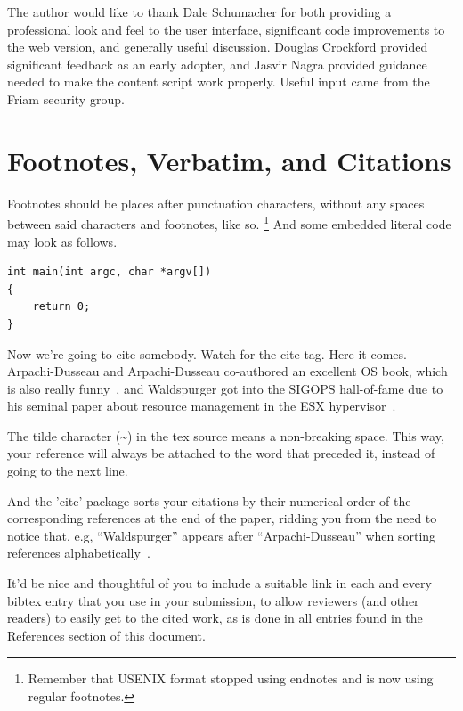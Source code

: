 The author would like to thank Dale Schumacher for both providing a professional look and feel to the user interface, significant code improvements to the web version, and generally useful discussion.  Douglas Crockford provided significant feedback as an early adopter, and Jasvir Nagra provided guidance needed to make the content script work properly.  Useful input came from the Friam security group.

\section{Footnotes, Verbatim, and Citations}

Footnotes should be places after punctuation characters, without any
spaces between said characters and footnotes, like so.%
\footnote{Remember that USENIX format stopped using endnotes and is
  now using regular footnotes.} And some embedded literal code may
look as follows.

\begin{verbatim}
int main(int argc, char *argv[]) 
{
    return 0;
}
\end{verbatim}

Now we're going to cite somebody. Watch for the cite tag. Here it
comes. Arpachi-Dusseau and Arpachi-Dusseau co-authored an excellent OS
book, which is also really funny~\cite{arpachiDusseau18:osbook}, and
Waldspurger got into the SIGOPS hall-of-fame due to his seminal paper
about resource management in the ESX hypervisor~\cite{waldspurger02}.

The tilde character (\~{}) in the tex source means a non-breaking
space. This way, your reference will always be attached to the word
that preceded it, instead of going to the next line.

And the 'cite' package sorts your citations by their numerical order
of the corresponding references at the end of the paper, ridding you
from the need to notice that, e.g, ``Waldspurger'' appears after
``Arpachi-Dusseau'' when sorting references
alphabetically~\cite{waldspurger02,arpachiDusseau18:osbook}. 

It'd be nice and thoughtful of you to include a suitable link in each
and every bibtex entry that you use in your submission, to allow
reviewers (and other readers) to easily get to the cited work, as is
done in all entries found in the References section of this document.

